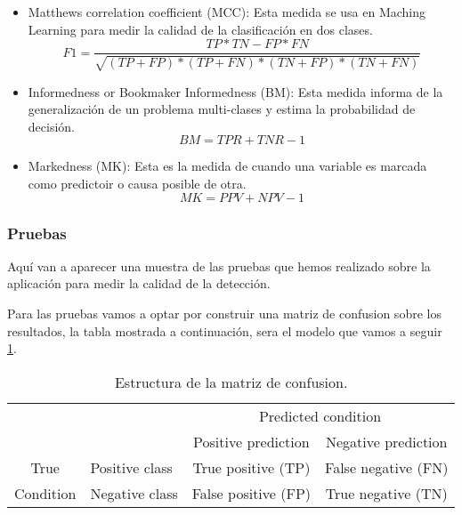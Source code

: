 \begin{itemize}
\item Matthews correlation coefficient (MCC):
Esta medida se usa en Maching Learning para medir la calidad de la clasificación en dos clases.
 \[F1=\frac{TP*TN-FP*FN}{\sqrt{(TP+FP)*(TP+FN)*(TN+FP)*(TN+FN)}}\]
 
\item Informedness or Bookmaker Informedness (BM):
Esta medida informa de la generalización de un problema multi-clases y estima la probabilidad de decisión.
 \[BM=TPR+TNR-1\]

\item Markedness (MK):
Esta es la medida de cuando una variable es marcada como predictoir o causa posible de otra.
 \[MK=PPV+NPV-1\]


\end{itemize}



\subsubsection{Pruebas}
Aquí van a aparecer una muestra de las pruebas que hemos realizado sobre la aplicación para medir la calidad de la detección.


Para las pruebas vamos a optar por construir una matriz de confusion sobre los resultados, la tabla mostrada a continuación, sera el modelo que vamos a seguir \ref{tab:ConfMatrix}.

\begin{table}
  \begin{center}
    \begin{tabular}{c l c c}
                 &                & \multicolumn{2}{c}{\cellcolor{brown!25}Predicted condition}   \\
                 &                & \cellcolor{brown!15}Positive prediction & \cellcolor{brown!45}Negative prediction \\
       \cellcolor{blue!15}True      & \cellcolor{blue!10}Positive class & \cellcolor{green!25}True positive (TP)  & \cellcolor{red!25}False negative (FN) \\
       \cellcolor{blue!15}Condition & \cellcolor{blue!30}Negative class & \cellcolor{red!25}False positive (FP) & \cellcolor{green!25}True negative (TN)  \\
    \end{tabular}
  \end{center}
  \caption{Estructura de la matriz de confusion.}
  \label{tab:ConfMatrix}
\end{table}



